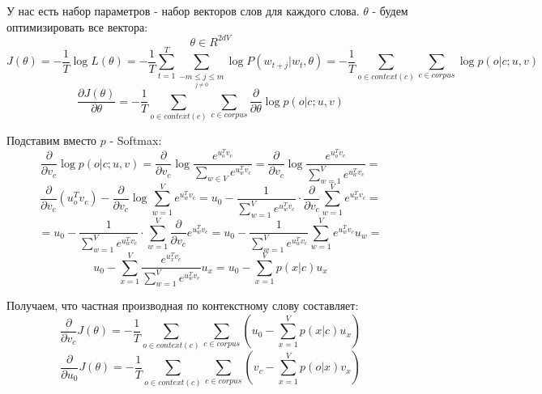 \documentclass[%
10pt, %
final, %
oneside, %
onecolumn, %
centertags]{article} %
\theoremstyle{plain}
\theoremstyle{definition}
\theoremstyle{remark}
\begin{document}
У нас есть набор параметров - набор векторов слов для каждого слова. $\theta$ - будем оптимизировать все вектора:
$$\theta \in R^{2dV}$$
$$J(\theta) = - \frac{1}{T}\log L(\theta) = - \frac{1}{T}\sum\limits_{t=1}^T \sum\limits_{\underset{j \neq 0}{-m \leq j \leq m}} \log P(w_{t+j} | w_t, \theta) = - \frac{1}{T} \sum\limits_{o \in context(c)} \sum\limits_{c \in corpus}\log p(o|c; u, v)$$
$$\frac{\partial J(\theta)}{\partial \theta} =  - \frac{1}{T}\sum\limits_{o \in context (c)} \sum\limits_{c \in corpus}\frac{\partial }{\partial \theta} \log p(o|c; u, v)$$

Подставим вместо $p$ - Softmax:
$$\frac{\partial}{\partial v_c}\log p(o|c; u, v) = \frac{\partial}{\partial v_c} \log \frac{e^{u_o^Tv_c}}{\sum\limits_{w \in V} e^{u_w^T v_c}} = \frac{\partial}{\partial v_c} \log \frac{e^{u_o^Tv_c}}{\sum\limits_{w = 1}^V e^{u_w^T v_c}} = $$
$$\frac{\partial }{\partial v_c}(u_o^T v_c) - \frac{\partial }{\partial v_c} \log \sum\limits_{w=1}^V e^{u_w^T v_c} = 
u_0 - \frac{1}{\sum\limits_{w=1}^V e^{u_w^T v_c}} \cdot \frac{\partial}{\partial v_c} \sum\limits_{w=1}^V e^{u_w^T  v_c}=$$
$$=u_0 - \frac{1}{\sum\limits_{w=1}^V e^{u_w^T v_c}} \cdot \sum\limits_{w=1}^V \frac{\partial}{\partial v_c} e^{u_w^T  v_c} = u_0 - \frac{1}{\sum\limits_{w=1}^V e^{u_w^T v_c}} \sum\limits_{w=1}^V e^{u_w^T  v_c}u_w = $$
$$u_0 - \sum\limits_{x = 1}^V \frac{e^{u_x^T v_c}}{\sum\limits_{w=1}^V e^{u_w^T v_c}}u_x =  u_0 - \sum\limits_{x=1}^V p(x|c) u_x $$

Получаем, что частная производная по контекстному слову составляет:
$$\frac{\partial}{\partial v_c}J(\theta) =  - \frac{1}{T}\sum\limits_{o \in context (c)} \sum\limits_{c \in corpus} (u_0 - \sum\limits_{x=1}^V p(x|c) u_x)$$
$$\frac{\partial}{\partial u_0}J(\theta) =  - \frac{1}{T}\sum\limits_{o \in context (c)} \sum\limits_{c \in corpus} (v_c - \sum\limits_{x=1}^V p(o|x) v_x)$$
\end{document}
